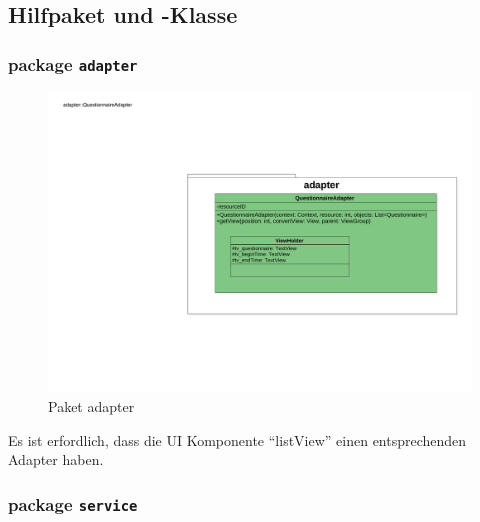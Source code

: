 \documentclass[a4paper]{scrreprt}
\begin{document}
            \subsection{Hilfpaket und -Klasse}

                \subsubsection{package \texttt{adapter}}

                    \begin{figure}[H]
                        \centering
                        \includegraphics[scale = 0.8]{adpater.pdf}
                        \caption{Paket adapter}
                    \end{figure}

                    Es ist erfordlich, dass die UI Komponente ``listView'' einen entsprechenden Adapter haben.

                \subsubsection{package \texttt{service}}
\end{document}
